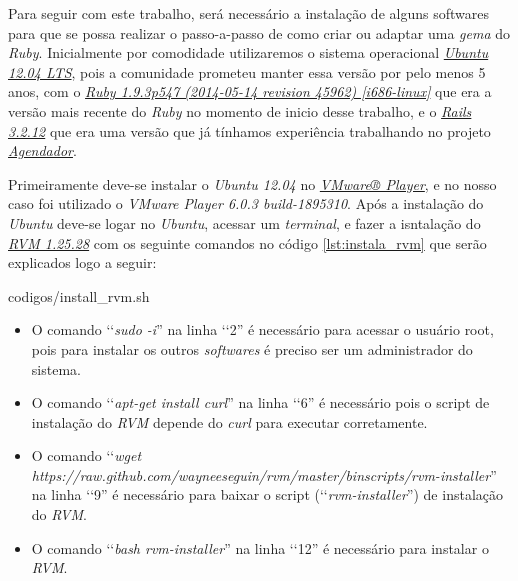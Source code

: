 Para seguir com este trabalho, será necessário a instalação de alguns softwares para que se possa realizar
o passo-a-passo de como criar ou adaptar uma \emph{gema} do \emph{Ruby}.
Inicialmente por comodidade utilizaremos o sistema operacional
\emph{\href{http://releases.ubuntu.com/12.04/}{Ubuntu 12.04 LTS}}, pois a comunidade prometeu manter essa
versão por pelo menos 5 anos, com o
\emph{\href{https://www.ruby-lang.org/en/downloads/}{Ruby 1.9.3p547 (2014-05-14 revision 45962) [i686-linux]}}
que era a versão mais recente do \emph{Ruby} no momento de inicio desse trabalho, e o
\emph{\href{http://rubyonrails.org/download/}{Rails 3.2.12}} que era uma versão que já tínhamos experiência
trabalhando no projeto \emph{\href{http://agendador.c3sl.ufpr.br/}{Agendador}}.

Primeiramente deve-se instalar o \emph{Ubuntu 12.04} no
\emph{\href{https://my.vmware.com/web/vmware/free\#desktop_end_user_computing/vmware_player/}{VMware® Player}},
e no nosso caso foi utilizado o \emph{VMware Player 6.0.3 build-1895310}. Após a instalação do \emph{Ubuntu}
deve-se logar no \emph{Ubuntu}, acessar um \emph{terminal}, e fazer a isntalação do
\emph{\href{https://github.com/wayneeseguin/rvm}{RVM 1.25.28}} com os seguinte comandos no código
\ref{lst:instala_rvm} que serão explicados logo a seguir:

 
 {codigos/install_rvm.sh}

\begin{itemize}

\item O comando ‘‘\emph{sudo -i}'' na linha ‘‘2'' é necessário para acessar o usuário root, pois
  para instalar os outros \emph{softwares} é preciso ser um administrador do sistema.

  \item O comando ‘‘\emph{apt-get install curl}'' na linha ‘‘6'' é necessário pois o script de
  instalação do \emph{RVM} depende do \emph{curl} para executar corretamente.

  \item O comando ‘‘\emph{wget https://raw.github.com/wayneeseguin/rvm/master/binscripts/rvm-installer}''
  na linha ‘‘9'' é necessário para baixar o script (‘‘\emph{rvm-installer}'') de instalação do \emph{RVM}.

  \item O comando ‘‘\emph{bash rvm-installer}'' na linha ‘‘12'' é necessário para instalar o \emph{RVM}.

\end{itemize}

